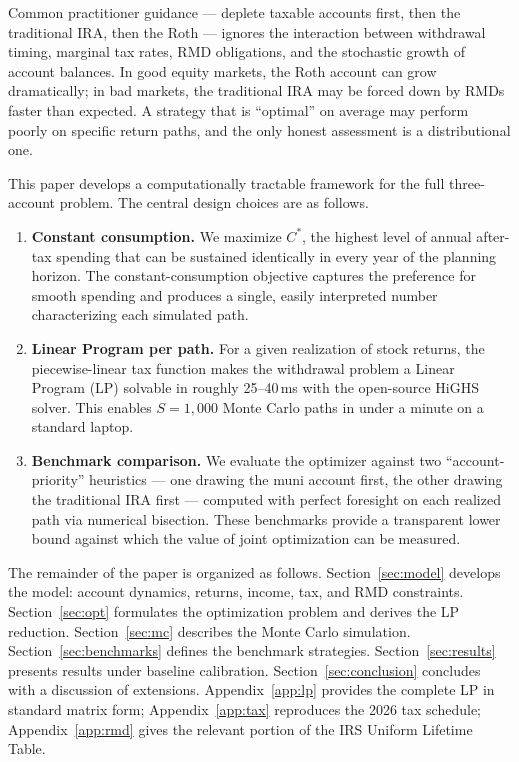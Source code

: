 \documentclass[12pt]{article}
\newcommand{\Copt}{C^{*}}
\begin{document}
Common practitioner guidance --- deplete taxable accounts first, then the
traditional IRA, then the Roth --- ignores the interaction between withdrawal
timing, marginal tax rates, RMD obligations, and the stochastic growth of
account balances. In good equity markets, the Roth account can grow
dramatically; in bad markets, the traditional IRA may be forced down by RMDs
faster than expected. A strategy that is ``optimal'' on average may perform
poorly on specific return paths, and the only honest assessment is a
distributional one.

This paper develops a computationally tractable framework for the full
three-account problem. The central design choices are as follows.

\begin{enumerate}[leftmargin=2em]
  \item \textbf{Constant consumption.} We maximize $\Copt$, the highest level
        of annual after-tax spending that can be sustained identically in every
        year of the planning horizon. The constant-consumption objective captures
        the preference for smooth spending and produces a single, easily
        interpreted number characterizing each simulated path.

  \item \textbf{Linear Program per path.} For a given realization of stock
        returns, the piecewise-linear tax function makes the withdrawal problem
        a Linear Program (LP) solvable in roughly 25--40\,ms with the
        open-source HiGHS solver. This enables $S = 1{,}000$ Monte Carlo paths
        in under a minute on a standard laptop.

  \item \textbf{Benchmark comparison.} We evaluate the optimizer against two
        ``account-priority'' heuristics --- one drawing the muni account first,
        the other drawing the traditional IRA first --- computed with perfect
        foresight on each realized path via numerical bisection. These
        benchmarks provide a transparent lower bound against which the value
        of joint optimization can be measured.
\end{enumerate}

The remainder of the paper is organized as follows. Section~\ref{sec:model}
develops the model: account dynamics, returns, income, tax, and RMD
constraints. Section~\ref{sec:opt} formulates the optimization problem and
derives the LP reduction. Section~\ref{sec:mc} describes the Monte Carlo
simulation. Section~\ref{sec:benchmarks} defines the benchmark strategies.
Section~\ref{sec:results} presents results under baseline calibration.
Section~\ref{sec:conclusion} concludes with a discussion of extensions.
Appendix~\ref{app:lp} provides the complete LP in standard matrix form;
Appendix~\ref{app:tax} reproduces the 2026 tax schedule;
Appendix~\ref{app:rmd} gives the relevant portion of the IRS Uniform
Lifetime Table.
\end{document}
